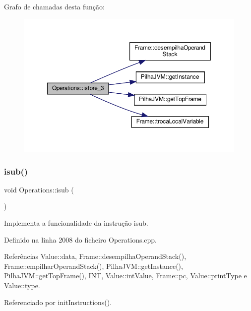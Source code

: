 Grafo de chamadas desta função\+:
\nopagebreak
\begin{figure}[H]
\begin{center}
\leavevmode
\includegraphics[width=350pt]{classOperations_a3ff20f0475eaaa28501ea330074f5cb7_cgraph}
\end{center}
\end{figure}
\mbox{\label{classOperations_ab2808e99336de64fefb2a9073bc251de}} 
\subsubsection{\texorpdfstring{isub()}{isub()}}
{\footnotesize\ttfamily void Operations\+::isub (\begin{DoxyParamCaption}{ }\end{DoxyParamCaption})\hspace{0.3cm}{\ttfamily [private]}}



Implementa a funcionalidade da instrução isub. 



Definido na linha 2008 do ficheiro Operations.\+cpp.



Referências Value\+::data, Frame\+::desempilha\+Operand\+Stack(), Frame\+::empilhar\+Operand\+Stack(), Pilha\+J\+V\+M\+::get\+Instance(), Pilha\+J\+V\+M\+::get\+Top\+Frame(), I\+NT, Value\+::int\+Value, Frame\+::pc, Value\+::print\+Type e Value\+::type.



Referenciado por init\+Instructions().

